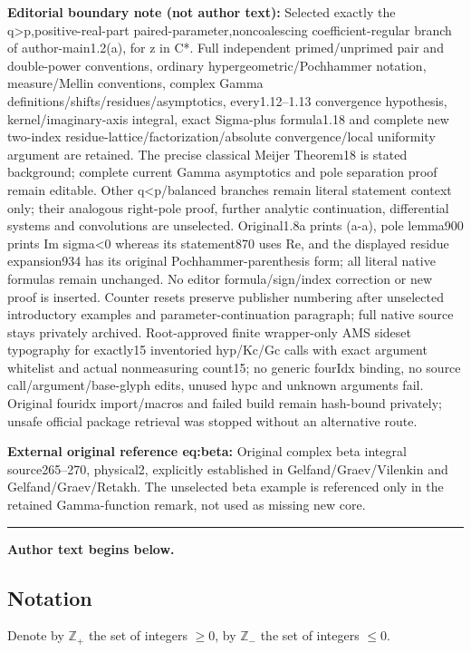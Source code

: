 \documentclass[11pt]{article}
\numberwithin{equation}{section}
\numberwithin{equation}{section}
\def\Z{{\mathbb Z}}
\def\le{\leqslant}
\def\ge{\geqslant}
\begin{document}
\medskip\noindent\textbf{Editorial boundary note (not author text):} Selected exactly the q>p,positive-real-part paired-parameter,noncoalescing coefficient-regular branch of author-main1.2(a), for z in C*. Full independent primed/unprimed pair and double-power conventions, ordinary hypergeometric/Pochhammer notation, measure/Mellin conventions, complex Gamma definitions/shifts/residues/asymptotics, every1.12–1.13 convergence hypothesis, kernel/imaginary-axis integral, exact Sigma-plus formula1.18 and complete new two-index residue-lattice/factorization/absolute convergence/local uniformity argument are retained. The precise classical Meijer Theorem18 is stated background; complete current Gamma asymptotics and pole separation proof remain editable. Other q<p/balanced branches remain literal statement context only; their analogous right-pole proof, further analytic continuation, differential systems and convolutions are unselected. Original1.8a prints (a-a), pole lemma900 prints Im sigma<0 whereas its statement870 uses Re, and the displayed residue expansion934 has its original Pochhammer-parenthesis form; all literal native formulas remain unchanged. No editor formula/sign/index correction or new proof is inserted. Counter resets preserve publisher numbering after unselected introductory examples and parameter-continuation paragraph; full native source stays privately archived. Root-approved finite wrapper-only AMS sideset typography for exactly15 inventoried hyp/Kc/Gc calls with exact argument whitelist and actual nonmeasuring count15; no generic fourIdx binding, no source call/argument/base-glyph edits, unused hypc and unknown arguments fail. Original fouridx import/macros and failed build remain hash-bound privately; unsafe official package retrieval was stopped without an alternative route.\par
\noindent\textbf{External original reference eq:beta:} Original complex beta integral source265–270, physical2, explicitly established in Gelfand/Graev/Vilenkin and Gelfand/Graev/Retakh. The unselected beta example is referenced only in the retained Gamma-function remark, not used as missing new core.\par
\medskip\hrule\medskip\noindent\textbf{Author text begins below.}\par
\setcounter{section}{1}\setcounter{subsection}{1}\setcounter{equation}{5}\setcounter{footnote}{1}
\subsection{Notation}
Denote by $\Z_+$ the set of integers $\ge 0$, by $\Z_-$ the set of integers $\le 0$.
\end{document}
